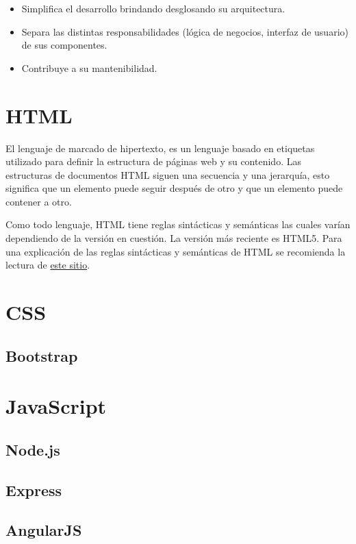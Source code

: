 \documentclass[10pt,a4paper]{report}
\begin{document}
\begin{itemize}
\item Simplifica el desarrollo brindando desglosando su arquitectura.
\item Separa las distintas responsabilidades (lógica de negocios, interfaz de usuario) de sus componentes.
\item Contribuye a su mantenibilidad.
\end{itemize}

\section{HTML}
El lenguaje de marcado de hipertexto, es un lenguaje basado en etiquetas utilizado para definir la estructura de páginas web y su contenido. Las estructuras de documentos HTML siguen una secuencia y una jerarquía, esto significa que un elemento puede seguir después de otro y que un elemento puede contener a otro.

Como todo lenguaje, HTML tiene reglas sintácticas y semánticas las cuales varían dependiendo de la versión en cuestión. La versión más reciente es HTML5. Para una explicación de las reglas sintácticas y semánticas de HTML se recomienda la lectura de \href{http://www.w3schools.com/html/}{este sitio}. 


\section{CSS}

\subsection{Bootstrap}

\section{JavaScript}

\subsection{Node.js}

\subsection{Express}

\subsection{AngularJS}
\end{document}

